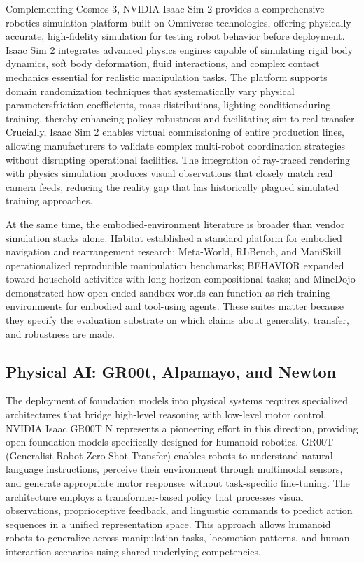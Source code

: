 Complementing Cosmos 3, NVIDIA Isaac Sim 2 provides a comprehensive robotics simulation platform built on Omniverse technologies, offering physically accurate, high-fidelity simulation for testing robot behavior before deployment. Isaac Sim 2 integrates advanced physics engines capable of simulating rigid body dynamics, soft body deformation, fluid interactions, and complex contact mechanics essential for realistic manipulation tasks. The platform supports domain randomization techniques that systematically vary physical parametersfriction coefficients, mass distributions, lighting conditionsduring training, thereby enhancing policy robustness and facilitating sim-to-real transfer. Crucially, Isaac Sim 2 enables virtual commissioning of entire production lines, allowing manufacturers to validate complex multi-robot coordination strategies without disrupting operational facilities. The integration of ray-traced rendering with physics simulation produces visual observations that closely match real camera feeds, reducing the reality gap that has historically plagued simulated training approaches.

At the same time, the embodied-environment literature is broader than vendor simulation stacks alone. Habitat established a standard platform for embodied navigation and rearrangement research; Meta-World, RLBench, and ManiSkill operationalized reproducible manipulation benchmarks; BEHAVIOR expanded toward household activities with long-horizon compositional tasks; and MineDojo demonstrated how open-ended sandbox worlds can function as rich training environments for embodied and tool-using agents. These suites matter because they specify the evaluation substrate on which claims about generality, transfer, and robustness are made.

\subsection{Physical AI: GR00t, Alpamayo, and Newton}

The deployment of foundation models into physical systems requires specialized architectures that bridge high-level reasoning with low-level motor control. NVIDIA Isaac GR00T N represents a pioneering effort in this direction, providing open foundation models specifically designed for humanoid robotics. GR00T (Generalist Robot Zero-Shot Transfer) enables robots to understand natural language instructions, perceive their environment through multimodal sensors, and generate appropriate motor responses without task-specific fine-tuning. The architecture employs a transformer-based policy that processes visual observations, proprioceptive feedback, and linguistic commands to predict action sequences in a unified representation space. This approach allows humanoid robots to generalize across manipulation tasks, locomotion patterns, and human interaction scenarios using shared underlying competencies.


